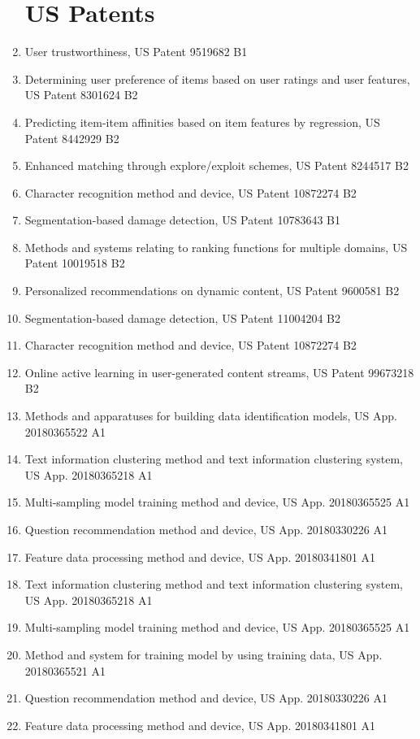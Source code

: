 \documentclass[line,10pt,final]{res}
\begin{document}
\begin{resume}
\begin{enumerate}
\section{\sc US Patents}

\item User trustworthiness, US Patent 9519682 B1
\item Determining user preference of items based on user ratings and user features, US Patent 8301624 B2
\item Predicting item-item affinities based on item features by regression, US Patent 8442929 B2
\item Enhanced matching through explore/exploit schemes, US Patent 8244517 B2
\item Character recognition method and device, US Patent 10872274 B2
\item Segmentation-based damage detection, US Patent 10783643 B1
\item Methods and systems relating to ranking functions for multiple domains, US Patent 10019518 B2
\item Personalized recommendations on dynamic content, US Patent 9600581 B2
\item Segmentation-based damage detection, US Patent 11004204 B2
\item Character recognition method and device, US Patent 10872274 B2
\item Online active learning in user-generated content streams, US Patent 99673218 B2
\item Methods and apparatuses for building data identification models, US App. 20180365522 A1
\item Text information clustering method and text information clustering system, US App. 20180365218 A1
\item Multi-sampling model training method and device, US App. 20180365525 A1
\item Question recommendation method and device, US App. 20180330226 A1
\item Feature data processing method and device, US App. 20180341801 A1
\item Text information clustering method and text information clustering system, US App. 20180365218 A1
\item Multi-sampling model training method and device, US App. 20180365525 A1
\item Method and system for training model by using training data, US App. 20180365521 A1
\item Question recommendation method and device, US App. 20180330226 A1
\item Feature data processing method and device, US App. 20180341801 A1


\end{enumerate}
\end{resume}
\end{document}
